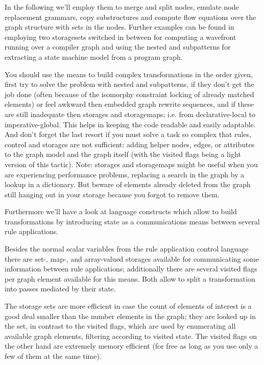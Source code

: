 \noindent In the following we'll employ them to merge and split nodes, emulate node replacement grammars, copy substructures and compute flow equations over the graph structure with sets in the nodes.
Further examples can be found in \cite{CompilerOptimization} employing two storagesets switched in between for computing a wavefront running over a compiler graph and \cite{ProgramUnderstanding} using the nested and subpatterns for extracting a state machine model from a program graph.

\begin{note}
You should use the means to build complex transformations in the order given, first try to solve the problem with nested and subpatterns, if they don't get the job done (often because of the isomorphy constraint locking of already matched elements) or feel awkward then embedded graph rewrite sequences, and if these are still inadequate then storages and storagemaps; i.e. from declarative-local to imperative-global. This helps in keeping the code readable and easily adaptable. And don't forget the last resort if you must solve a task so complex that rules, control and storages are not sufficient: adding helper nodes, edges, or attributes to the graph model and the graph itself (with the visited flags being a light version of this tactic). Note: storages and storagemaps might be useful when you are experiencing performance problems, replacing a search in the graph by a lookup in a dictionary. But beware of elements already deleted from the graph still hanging out in your storage because you forgot to remove them.
\end{note}

Furthermore we'll have a look at language constructs which allow to build transformations by introducing state as a communications means between several rule applications.

Besides the normal scalar variables from the rule application control language there are set-, map-, and array-valued storages available for communicating some information between rule applications;
additionally there are several visited flags per graph element available for this means.
Both allow to split a transformation into passes mediated by their state.

\begin{note}
The storage sets are more efficient in case the count of elements of interest is a good deal smaller than the number elements in the graph; they are looked up in the set, in contrast to the visited flags, which are used by enumerating all available graph elements, filtering according to visited state.
The visited flags on the other hand are extremely memory efficient (for free as long as you use only a few of them at the same time).
\end{note}


